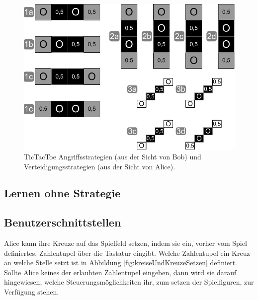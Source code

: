 
\begin{figure}[!htbp]
  \centering
  \includegraphics[scale = 0.8]{inhalt/abbildungen/verteidigung_ist_angriff.pdf}
  \caption{TicTacToe Angriffsstrategien (aus der Sicht von Bob) und Verteidigungsstrategien (aus der Sicht von Alice).}
  \label{fig:verteidigung_ist_angriff}
\end{figure}

\subsection{Lernen ohne Strategie}

\subsection{Benutzerschnittstellen}

Alice kann ihre Kreuze auf das Spielfeld setzen, indem sie ein, vorher vom Spiel definiertes, Zahlentupel über die Tastatur eingibt. Welche Zahlentupel ein Kreuz an welche Stelle setzt ist in Abbildung \ref{fig:kreiseUndKreuzeSetzen} definiert. Sollte Alice keines der erlaubten Zahlentupel eingeben, dann wird sie darauf hingewiesen, welche Steuerungsmöglichkeiten ihr, zum setzen der Spielfiguren, zur Verfügung stehen.

